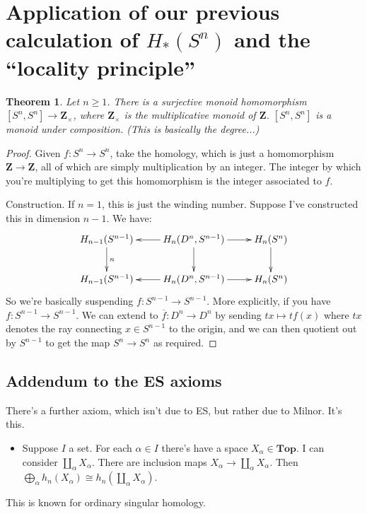 \documentclass{amsart}
\theoremstyle{theorem}
\newtheorem{theorem}{Theorem}[section]
\theoremstyle{definition}
\newcommand{\Z}{\mathbf Z}
\begin{document}
\section{Application of our previous calculation of $ H_\ast(S^n)$ and the ``locality principle''}
\begin{theorem}
Let $n\geq 1$. There is a surjective monoid homomorphism $[S^n,S^n]\to \Z_\times$, where $\Z_\times$ is the multiplicative monoid of $\Z$. $[S^n,S^n]$ is a monoid under composition. (This is basically the degree...)
\end{theorem}
\begin{proof}
Given $f:S^n\to S^n$, take the homology, which is just a homomorphism $\Z\to \Z$, all of which are simply multiplication by an integer. The integer by which you're multiplying to get this homomorphism is the integer associated to $f$.

Construction. If $n=1$, this is just the winding number. Suppose I've constructed this in dimension $n-1$. We have:
	\begin{equation*}
	\xymatrix{ H_{n-1}(S^{n-1})\ar[d]^n & \ar[l] H_n(D^n,S^{n-1})\ar[r]\ar[d] & H_n(S^n)\ar[d]\\
	 H_{n-1}(S^{n-1}) & \ar[l] H_n(D^n,S^{n-1})\ar[r] & H_n(S^n)}
	\end{equation*}
So we're basically suspending $f:S^{n-1}\to S^{n-1}$. More explicitly, if you have $f:S^{n-1}\to S^{n-1}$. We can extend to $\overline{f}:D^n\to D^n$ by sending $tx\mapsto tf(x)$ where $tx$ denotes the ray connecting $x\in S^{n-1}$ to the origin, and we can then quotient out by $S^{n-1}$ to get the map $S^n\to S^n$ as required.
\end{proof}
\subsection{Addendum to the ES axioms}
There's a further axiom, which isn't due to ES, but rather due to Milnor. It's this.
\begin{itemize}
\item Suppose $I$ a set. For each $\alpha\in I$ there's have a space $X_\alpha\in\mathbf{Top}$. I can consider $\coprod_\alpha X_\alpha$. There are inclusion maps $X_\alpha\to\coprod_\alpha X_\alpha$. Then $\bigoplus_\alpha h_n(X_\alpha)\cong h_n\left(\coprod_\alpha X_\alpha\right)$.
\end{itemize}
This is known for ordinary singular homology.
\end{document}
